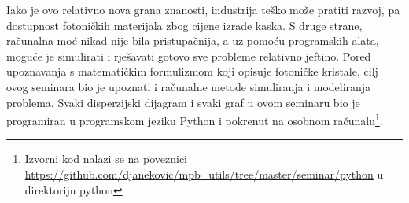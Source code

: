 \documentclass[utf8, seminar, numeric]{fer}
\begin{document}
Iako je ovo relativno nova grana znanosti, industrija teško može pratiti
razvoj, pa dostupnost fotoničkih materijala zbog cijene izrade kaska. S druge
strane, računalna moć nikad nije bila pristupačnija, a uz pomoću programskih
alata, moguće je simulirati i rješavati gotovo sve probleme relativno jeftino.
Pored upoznavanja s matematičkim formulizmom koji opisuje fotoničke kristale,
cilj ovog seminara bio je upoznati i računalne metode simuliranja i modeliranja
problema. Svaki disperzijski dijagram i svaki graf u ovom seminaru bio je
programiran u programskom jeziku Python i pokrenut na osobnom računalu\footnote{
Izvorni kod nalazi se na poveznici \url{https://github.com/djanekovic/mpb_utils/tree/master/seminar/python}
u direktoriju python}.




\nocite{*}
\end{document}
